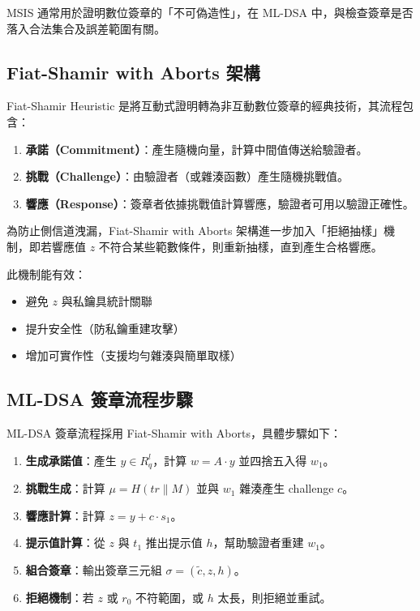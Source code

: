 \documentclass[12pt, a4paper, fleqn]{./styles/ntust_report}
\begin{document}
MSIS 通常用於證明數位簽章的「不可偽造性」，在 ML-DSA 中，與檢查簽章是否落入合法集合及誤差範圍有關。



\subsection{Fiat-Shamir with Aborts 架構}

Fiat-Shamir Heuristic 是將互動式證明轉為非互動數位簽章的經典技術，其流程包含：
\begin{enumerate}
  \item \textbf{承諾（Commitment）}：產生隨機向量，計算中間值傳送給驗證者。
  \item \textbf{挑戰（Challenge）}：由驗證者（或雜湊函數）產生隨機挑戰值。
  \item \textbf{響應（Response）}：簽章者依據挑戰值計算響應，驗證者可用以驗證正確性。
\end{enumerate}

為防止側信道洩漏，Fiat-Shamir with Aborts 架構進一步加入「拒絕抽樣」機制，即若響應值 $z$ 不符合某些範數條件，則重新抽樣，直到產生合格響應。

此機制能有效：
\begin{itemize}
  \item 避免 $z$ 與私鑰具統計關聯
  \item 提升安全性（防私鑰重建攻擊）
  \item 增加可實作性（支援均勻雜湊與簡單取樣）
\end{itemize}



\subsection{ML-DSA 簽章流程步驟}

ML-DSA 簽章流程採用 Fiat-Shamir with Aborts，具體步驟如下：

\begin{enumerate}
  \item \textbf{生成承諾值}：產生 $y \in R_q^l$，計算 $w = A \cdot y$ 並四捨五入得 $w_1$。
  \item \textbf{挑戰生成}：計算 $\mu = H(tr \| M)$ 並與 $w_1$ 雜湊產生 challenge $c$。
  \item \textbf{響應計算}：計算 $z = y + c \cdot s_1$。
  \item \textbf{提示值計算}：從 $z$ 與 $t_1$ 推出提示值 $h$，幫助驗證者重建 $w_1$。
  \item \textbf{組合簽章}：輸出簽章三元組 $\sigma = (\tilde{c}, z, h)$。
  \item \textbf{拒絕機制}：若 $z$ 或 $r_0$ 不符範圍，或 $h$ 太長，則拒絕並重試。
\end{enumerate}
\end{document}
